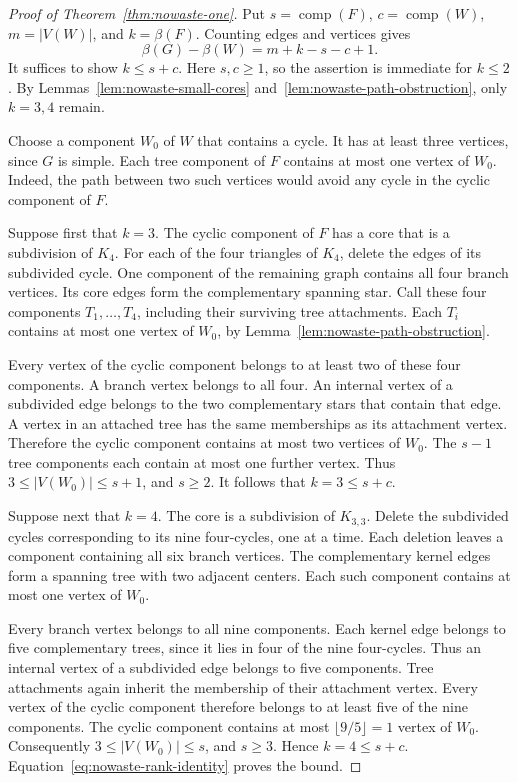 \begin{proof}[Proof of Theorem~\ref{thm:nowaste-one}]
Put $s=\operatorname{comp}(F)$, $c=\operatorname{comp}(W)$, $m=|V(W)|$, and $k=\beta(F)$.
Counting edges and vertices gives
\begin{equation}\label{eq:nowaste-rank-identity}
 \beta(G)-\beta(W)=m+k-s-c+1.
\end{equation}
It suffices to show $k\le s+c$.
Here $s,c\ge1$, so the assertion is immediate for $k\le2$.
By Lemmas~\ref{lem:nowaste-small-cores} and~\ref{lem:nowaste-path-obstruction}, only $k=3,4$ remain.

Choose a component $W_0$ of $W$ that contains a cycle.
It has at least three vertices, since $G$ is simple.
Each tree component of $F$ contains at most one vertex of $W_0$.
Indeed, the path between two such vertices would avoid any cycle in the cyclic component of $F$.

Suppose first that $k=3$.
The cyclic component of $F$ has a core that is a subdivision of $K_4$.
For each of the four triangles of $K_4$, delete the edges of its subdivided cycle.
One component of the remaining graph contains all four branch vertices.
Its core edges form the complementary spanning star.
Call these four components $T_1,\ldots,T_4$, including their surviving tree attachments.
Each $T_i$ contains at most one vertex of $W_0$, by Lemma~\ref{lem:nowaste-path-obstruction}.

Every vertex of the cyclic component belongs to at least two of these four components.
A branch vertex belongs to all four.
An internal vertex of a subdivided edge belongs to the two complementary stars that contain that edge.
A vertex in an attached tree has the same memberships as its attachment vertex.
Therefore the cyclic component contains at most two vertices of $W_0$.
The $s-1$ tree components each contain at most one further vertex.
Thus $3\le |V(W_0)|\le s+1$, and $s\ge2$.
It follows that $k=3\le s+c$.

Suppose next that $k=4$.
The core is a subdivision of $K_{3,3}$.
Delete the subdivided cycles corresponding to its nine four-cycles, one at a time.
Each deletion leaves a component containing all six branch vertices.
The complementary kernel edges form a spanning tree with two adjacent centers.
Each such component contains at most one vertex of $W_0$.

Every branch vertex belongs to all nine components.
Each kernel edge belongs to five complementary trees, since it lies in four of the nine four-cycles.
Thus an internal vertex of a subdivided edge belongs to five components.
Tree attachments again inherit the membership of their attachment vertex.
Every vertex of the cyclic component therefore belongs to at least five of the nine components.
The cyclic component contains at most $\lfloor9/5\rfloor=1$ vertex of $W_0$.
Consequently $3\le |V(W_0)|\le s$, and $s\ge3$.
Hence $k=4\le s+c$.
Equation~\ref{eq:nowaste-rank-identity} proves the bound.


\end{proof}
